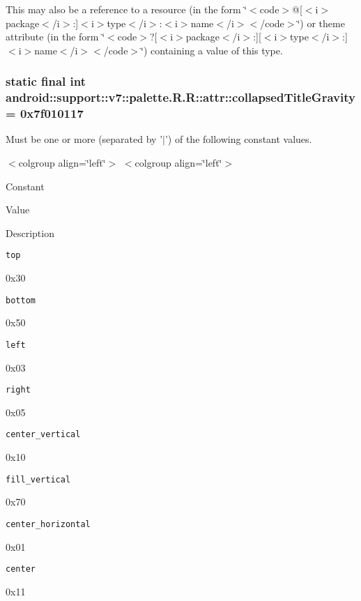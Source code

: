 This may also be a reference to a resource (in the form \char`\"{}$<$code$>$@\mbox{[}$<$i$>$package$<$/i$>$:\mbox{]}$<$i$>$type$<$/i$>$:$<$i$>$name$<$/i$>$$<$/code$>$\char`\"{}) or theme attribute (in the form \char`\"{}$<$code$>$?\mbox{[}$<$i$>$package$<$/i$>$:\mbox{]}\mbox{[}$<$i$>$type$<$/i$>$:\mbox{]}$<$i$>$name$<$/i$>$$<$/code$>$\char`\"{}) containing a value of this type. \hypertarget{classandroid_1_1support_1_1v7_1_1palette_1_1_r_1_1attr_63d943cd27e760c67497b5cf6c19fdd1}{
\subsubsection[{collapsedTitleGravity}]{\setlength{\rightskip}{0pt plus 5cm}static final int android::support::v7::palette.R.R::attr::collapsedTitleGravity = 0x7f010117}}
\label{classandroid_1_1support_1_1v7_1_1palette_1_1_r_1_1attr_63d943cd27e760c67497b5cf6c19fdd1}


Must be one or more (separated by '$|$') of the following constant values. \begin{TabularC}{0}
\hline
\end{TabularC}
$<$colgroup align=\char`\"{}left\char`\"{}$>$ $<$colgroup align=\char`\"{}left\char`\"{}$>$ 

Constant

Value

Description 

{\tt top}

0x30

{\tt bottom}

0x50

{\tt left}

0x03

{\tt right}

0x05

{\tt center\_\-vertical}

0x10

{\tt fill\_\-vertical}

0x70

{\tt center\_\-horizontal}

0x01

{\tt center}

0x11

